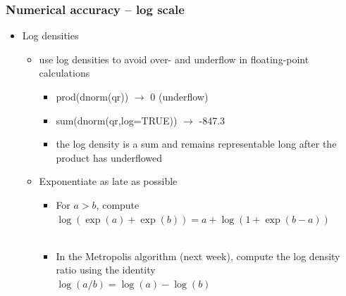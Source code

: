 \documentclass[10pt]{beamer}
\begin{document}
\begin{frame}

\frametitle{Numerical accuracy -- log scale}

  \begin{itemize}
  \item Log densities
    \begin{itemize}
    \item use log densities to avoid over- and underflow in floating-point
      calculations
      \begin{itemize}
      \item {\color{uured} prod(dnorm(qr)) $\rightarrow$} {\color{red} 0 (underflow)}
      \item {\color{uured} sum(dnorm(qr,log=TRUE)) $\rightarrow$} {\color{uured} -847.3}
      \item<2-> the log density is a sum and remains representable long
        after the product has underflowed
    \end{itemize}
    \item<3-> Exponentiate as late as possible
      \begin{itemize}
      \item<4-> For $a>b$, compute $\log(\exp(a)+\exp(b)) = a + \log(1+\exp(b-a))$\\
        \\
      \item<7-> In the Metropolis algorithm (next week), compute the log
        density ratio using the identity\\
        $\log(a/b)=\log(a)-\log(b)$
    \end{itemize}
    \end{itemize}
  \end{itemize}

\end{frame}
\end{document}
